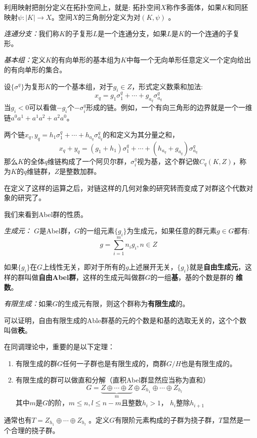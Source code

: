 \documentclass[supercite]{HustGraduPaper}
\begin{document}
\begin{appendices}
		利用映射把剖分定义在拓扑空间上，就是: 拓扑空间$X$称作多面体，如果$K$和同胚映射$\psi: |K| \to X$。空间$X$的三角剖分定义为对$(K,\psi)$	。
		
		\textit{连通分支：}我们称$K$的子复形$L$是一个连通分支，如果$L$是$K$的一个连通的子复形。
		
		\textit{基本组：}定义$K$的有向单形的基本组为$K$中每一个无向单形任意定义一个定向给出的有向单形的集合。
		
		设$\{\sigma^q\}$为复形$K$的一个基本组，对于$g_i \in Z$，形式定义数乘和加法:
		\begin{equation}
		x_q = g_1 \sigma_1^q + \cdots + g_{a_q} \sigma_{a_q}^q
		\end{equation}
		当$g_i < 0$可以看做$-g_i$个$- \sigma_i^q$形成的链。例如，一个有向三角形的边界就是一个一维链$a^0 a^1 + a^1 a^2 + a^2 a^0$。
		
		两个链$x_q,y_q = h_1 \sigma_1^q + \cdots +h_{a_q} \sigma_{a_q}^q$的和定义为其分量之和，
		\begin{equation}
		x_q + y_q =  (g_1 + h_1) \sigma_1^q + \cdots +(h_{a_q} + g_{a_q}) \sigma_{a_q}^q
		\end{equation}
		那么$K$的全体$q$维链构成了一个阿贝尔群，${\sigma^q_i}$视为基，这个群记做$C_q(K,Z)$，称为$K$的$q$维链群，$Z$是整数加群。
		
		在定义了这样的运算之后，对链这样的几何对象的研究转而变成了对群这个代数对象的研究了。
		
		我们来看到Abel群的性质。
		
		\textit{生成元：} $G$是Abel群，$G$的一组元素$\{g_i\}$为生成元，如果任意的群元素$g \in G$都有:
		\begin{equation}
		g = \sum_{i = 1}^{m}n_i g_i, n \in Z
		\end{equation}
		
		如果$\{g_i\}$在$G$上线性无关，即对于所有的$g$上述展开无关，$\{g_i\}$就是\textbf{自由生成元}，这样的群叫做\textbf{自由Abel群}，这样的生成元叫做群$G$的一组\textbf{基}，基的个数是群的
		\textbf{维数}。
		
		\textit{有限生成：}如果$G$的生成元有限，则这个群称为\textbf{有限生成}的。
		
		可以证明，自由有限生成的Able群基的元的个数是和基的选取无关的，这个个数叫做\textbf{秩}。
		
		在同调理论中，重要的是以下定理：
		
		\begin{enumerate}
			\item 有限生成的群$G$任何一子群也是有限生成的，商群$G/H$也是有限生成的。
			\item 有限生成的群可以做直和分解（直积Abel群显然应当称为直和）
			\begin{equation}
			G = \underbrace{Z \oplus \cdots \oplus Z}_m \oplus Z_{h_1} \oplus \cdots \oplus Z_{h_l}
			\end{equation}
			其中$m$是$G$的阶，$m\le n, l\le n-m$且整数$h_i > 1$， $h_i$整除$h_{i+1}$
		\end{enumerate}
		通常也有$T =  Z_{h_1} \oplus \cdots \oplus Z_{h_l}$  。定义$G$有限阶元素构成的子群为挠子群，$T$显然是一个合理的挠子群。
		

\end{appendices}
\end{document}
